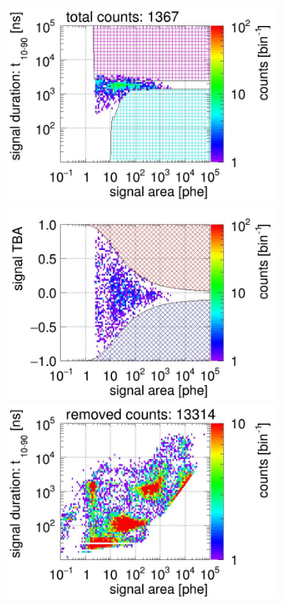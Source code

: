 \begin{landscape}
\begin{figure}[!p]
\begin{subfigure}[t]{0.33\textwidth}
			\includegraphics[width=\figurewidth,clip,trim={0 98 0 0}]{Figures/GasTest/CutsValid/res64767/pdpa23Vecfig64767.jpg}
			\includegraphics[width=\figurewidth,clip,trim={0 98 0 40}]{Figures/GasTest/CutsValid/res64767/tbapa23Vecfig64767.jpg}
			\includegraphics[width=\figurewidth,clip,trim={0 98 0 10}]{Figures/GasTest/CutsValid/res64767/pdpaX23Vecfig64767.jpg}

\end{subfigure}
\end{figure}
\end{landscape}

